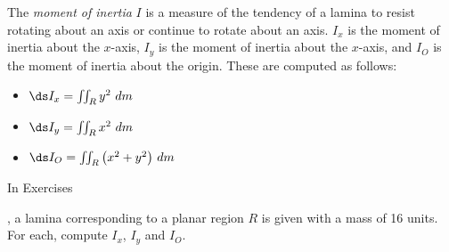 {The \textit{moment of inertia} $I$ is a measure of the tendency of a lamina to resist rotating about an axis or continue to rotate about an axis. $I_x$ is the moment of inertia about the $x$-axis, $I_y$ is the moment of inertia about the $x$-axis, and $I_O$ is the moment of inertia about the origin. These are computed as follows:
\begin{itemize}
	\item $\ds I_x = \iint_R y^2\ dm$
	\item	$\ds I_y = \iint_R x^2\ dm$
	\item	$\ds I_O = \iint_R \big(x^2+y^2\big)\ dm$
\end{itemize} \noindent In Exercises} 
{,  a lamina corresponding to a planar region $R$ is given with a mass of 16 units. For each, compute $I_x$, $I_y$ and $I_O$.
}
